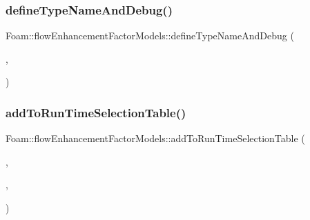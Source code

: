 \subsubsection{\texorpdfstring{define\+Type\+Name\+And\+Debug()}{defineTypeNameAndDebug()}\hspace{0.1cm}{\footnotesize\ttfamily [3/3]}}
{\footnotesize\ttfamily Foam\+::flow\+Enhancement\+Factor\+Models\+::define\+Type\+Name\+And\+Debug (\begin{DoxyParamCaption}\item[{\hyperlink{classFoam_1_1flowEnhancementFactorModels_1_1RezkallahSims}{Rezkallah\+Sims}}]{,  }\item[{0}]{ }\end{DoxyParamCaption})}

\mbox{\label{namespaceFoam_1_1flowEnhancementFactorModels_ac611bcabf3e09f06592e67576f4b3828}} 
\subsubsection{\texorpdfstring{add\+To\+Run\+Time\+Selection\+Table()}{addToRunTimeSelectionTable()}\hspace{0.1cm}{\footnotesize\ttfamily [3/3]}}
{\footnotesize\ttfamily Foam\+::flow\+Enhancement\+Factor\+Models\+::add\+To\+Run\+Time\+Selection\+Table (\begin{DoxyParamCaption}\item[{\hyperlink{classFoam_1_1flowEnhancementFactorModel}{flow\+Enhancement\+Factor\+Model}}]{,  }\item[{\hyperlink{classFoam_1_1flowEnhancementFactorModels_1_1RezkallahSims}{Rezkallah\+Sims}}]{,  }\item[{flow\+Enhancement\+Factor\+Models}]{ }\end{DoxyParamCaption})}

